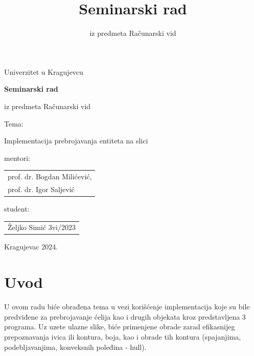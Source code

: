 \documentclass[fontsize=12bp, paper=a4]{scrarticle}
\title{Seminarski rad}
\subtitle{iz predmeta Računarski vid}
\begin{document}
\begin{titlepage}
    
    \begin{center}
        
        \vspace*{8cm}
        
        \large{Univerzitet u Kragujevcu}
        
        \vspace*{1cm}

        {\bfseries \LARGE Seminarski rad}
        
        \large{iz predmeta Računarski vid}
        
        \vspace*{1cm}
        \large{Tema:}

        \Large{Implementacija prebrojavanja entiteta na slici}


        \vspace*{2cm}
    \end{center}
    \hfill{\parbox[s]{8cm}{

    mentori: 
    \begin{tabular}{l}
        \\
        prof. dr. Bogdan Milićević, \\
        prof. dr. Igor Saljević
    \end{tabular}
    
    student: \begin{tabular}{l}
        Željko Simić 3vi/2023
    \end{tabular}
    }}

    \hspace*{\fill} 

    \vspace*{2cm}

    \begin{center}
        Kragujevac 2024.
    \end{center}
\end{titlepage}


\setcounter{page}{1}
\justifying
\linespread{0.9}
\cfoot[\pagemark]{\pagemark}
\ofoot[]{}
\chead[]{}
%
\justifying

\section{Uvod}
U ovom radu biće obrađena tema u vezi korišćenje implementacija koje su bile predviđene za prebrojavanje ćelija kao i drugih objekata kroz predstavljena 3 programa. Uz uzete ulazne slike, biće primenjene obrade zarad efikasnijeg prepoznavanja ivica ili kontura, boja, kao i obrade tih kontura (spajanjima, podebljavanjima, konveksnih poleđina - hull).
\end{document}
